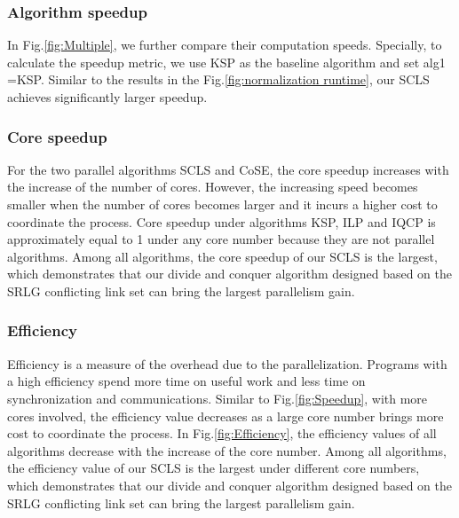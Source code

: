 \subsubsection{Algorithm speedup}

In Fig.\ref{fig:Multiple}, we further compare their computation speeds. Specially, to calculate the speedup metric,
we use KSP as the baseline algorithm and set alg1 =KSP. Similar to the results in the Fig.\ref{fig:normalization runtime}, our SCLS achieves significantly larger speedup.

\subsubsection{Core speedup}

For the two parallel algorithms SCLS and CoSE, the core speedup   increases with the increase of the number of cores. %
However, the increasing speed becomes smaller when the number of cores becomes larger and it incurs a higher cost to coordinate the process. Core speedup under algorithms KSP, ILP and IQCP is  approximately equal to 1 under any core number because they are not parallel algorithms. Among all algorithms, the core speedup of our SCLS is the largest, which demonstrates that our divide and conquer algorithm designed  based on the SRLG conflicting link set can bring the largest parallelism gain.

\subsubsection{Efficiency}
Efficiency is a measure of the overhead due to the parallelization. Programs with a high efficiency spend more time on useful work and less time on synchronization and communications. Similar to Fig.\ref{fig:Speedup}, with more cores involved, the efficiency value decreases  as a large core number brings more cost to coordinate the process. In Fig.\ref{fig:Efficiency}, the efficiency values of all algorithms decrease with the increase of the core number. Among all algorithms, the efficiency value of our SCLS is the largest under different core numbers, which demonstrates that our divide and conquer algorithm designed  based on the SRLG conflicting link set can bring the largest parallelism gain.



